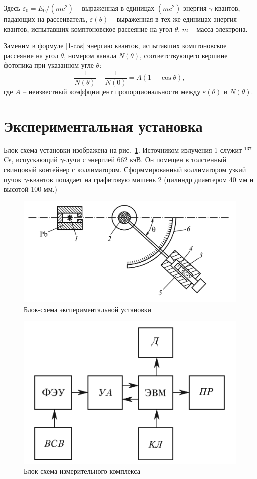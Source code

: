 	Здесь $\varepsilon_0 = E_0/(mc^2)$ -- выраженная в единицах $(mc^2)$ энергия $\gamma$-квантов, падающих на рассеиватель, $\varepsilon(\theta)$ -- выраженная в тех же единицах энергия квантов, испытавших комптоновское рассеяние на угол $\theta$, $m$ -- масса электрона.
	
	Заменим в формуле \eqref{1-cos} энергию квантов, испытавших комптоновское рассеяние на угол $\theta$, номером канала $N(\theta)$, соответствующего вершине фотопика при указанном угле $\theta$:
	\begin{equation}
		\label{kek}
		\tag{$\star \star \star$}
		\frac{1}{N(\theta)} - \frac{1}{N(0)} = A (1 - \cos \theta),
	\end{equation}
	где $A$ -- неизвестный коэффциицент пропорциональности между $\varepsilon(\theta)$ и $N(\theta)$.

\section{Экспериментальная установка}

    Блок-схема установки изображена на рис.~\ref{exp_scheme}. Источником излучения 1 служит $^{137}$Cs, испускающий $\gamma$-лучи с энергией 662 кэВ. Он помещен в толстенный свинцовый контейнер с коллиматором. Сформмированный коллиматором узкий пучок $\gamma$-квантов попадает на графитовую мишень 2 (цилиндр диамтером 40 мм и высотой 100 мм.)

    \begin{figure}[h!]
        \centering
        \includegraphics[width = 12 cm]{images/exp_scheme}
        \caption{Блок-схема экспериментальной установки}
        \label{exp_scheme}
    \end{figure}

    \begin{figure}[h!]
        \centering
        \includegraphics[width = 8 cm]{images/exp_measure_scheme}
        \caption{Блок-схема измерительного комплекса}
        \label{exp_measure_scheme}
    \end{figure}
    
